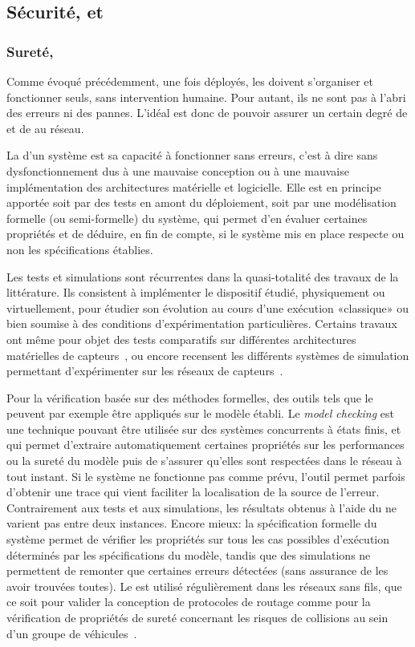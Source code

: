     \subsection{Sécurité,  et \resilience}
        \subsubsection{Sureté, \resilience}
Comme évoqué précédemment, une fois déployés, les \rcs doivent s'organiser et fonctionner seuls, sans intervention humaine.
Pour autant, ils ne sont pas à l'abri des erreurs ni des pannes.
L'idéal est donc de pouvoir assurer un certain degré de  et de \resilience au réseau.

La  d'un système est sa capacité à fonctionner sans erreurs, c'est à dire sans dysfonctionnement dus à une mauvaise conception ou à une mauvaise implémentation des architectures matérielle et logicielle.
Elle est en principe apportée soit par des tests en amont du déploiement, soit par une modélisation formelle (ou semi-formelle) du système, qui permet d'en évaluer certaines propriétés et de déduire, en fin de compte, si le système mis en place respecte ou non les spécifications établies.

Les tests et simulations sont récurrentes dans la quasi-totalité des travaux de la littérature.
Ils consistent à implémenter le dispositif étudié, physiquement ou virtuellement, pour étudier son évolution au cours d'une exécution «classique» ou bien soumise à des conditions d'expérimentation particulières.
Certains travaux ont même pour objet des tests comparatifs sur différentes architectures matérielles de capteurs~\cite{PLP06}, ou encore recensent les différents systèmes de simulation permettant d'expérimenter sur les réseaux de capteurs~\cite{AAAHN12}.

Pour la vérification basée sur des méthodes formelles, des outils tels que le  peuvent par exemple être appliqués sur le modèle établi.
Le \textit{model checking} est une technique pouvant être utilisée sur des systèmes concurrents à états finis, et qui permet d'extraire automatiquement certaines propriétés sur les performances ou la sureté du modèle puis de s'assurer qu'elles sont respectées dans le réseau à tout instant.
Si le système ne fonctionne pas comme prévu, l'outil permet parfois d'obtenir une trace qui vient faciliter la localisation de la source de l'erreur.
Contrairement aux tests et aux simulations, les résultats obtenus à l'aide du  ne varient pas entre deux instances.
Encore mieux: la spécification formelle du système permet de vérifier les propriétés sur tous les cas possibles d'exécution déterminés par les spécifications du modèle, tandis que des simulations ne permettent de remonter que certaines erreurs détectées (sans assurance de les avoir trouvées toutes).
Le \textit{} est utilisé régulièrement dans les réseaux sans fils, que ce soit pour valider la conception de protocoles de routage comme pour la vérification de propriétés de sureté concernant les risques de collisions au sein d'un groupe de véhicules~\cite{E-ZCGGK12}.

